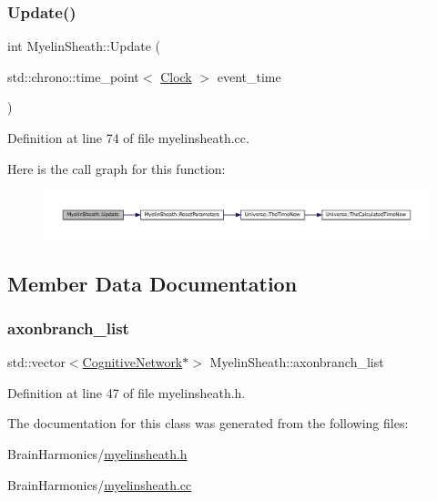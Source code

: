 \subsubsection{\texorpdfstring{Update()}{Update()}}
{\footnotesize\ttfamily int Myelin\+Sheath\+::\+Update (\begin{DoxyParamCaption}\item[{std\+::chrono\+::time\+\_\+point$<$ \mbox{\hyperlink{universe_8h_a0ef8d951d1ca5ab3cfaf7ab4c7a6fd80}{Clock}} $>$}]{event\+\_\+time }\end{DoxyParamCaption})}



Definition at line 74 of file myelinsheath.\+cc.

Here is the call graph for this function\+:\nopagebreak
\begin{figure}[H]
\begin{center}
\leavevmode
\includegraphics[width=350pt]{class_myelin_sheath_af53c8f36ee963168dec09b74a6be8e4c_cgraph}
\end{center}
\end{figure}


\subsection{Member Data Documentation}
\mbox{\label{class_myelin_sheath_a7877f5feab5bae37903653bf89dc3d5b}} 
\subsubsection{\texorpdfstring{axonbranch\+\_\+list}{axonbranch\_list}}
{\footnotesize\ttfamily std\+::vector$<$\mbox{\hyperlink{class_cognitive_network}{Cognitive\+Network}}$\ast$$>$ Myelin\+Sheath\+::axonbranch\+\_\+list\hspace{0.3cm}{\ttfamily [protected]}}



Definition at line 47 of file myelinsheath.\+h.



The documentation for this class was generated from the following files\+:\begin{DoxyCompactItemize}
\item 
Brain\+Harmonics/\mbox{\hyperlink{myelinsheath_8h}{myelinsheath.\+h}}\item 
Brain\+Harmonics/\mbox{\hyperlink{myelinsheath_8cc}{myelinsheath.\+cc}}\end{DoxyCompactItemize}
